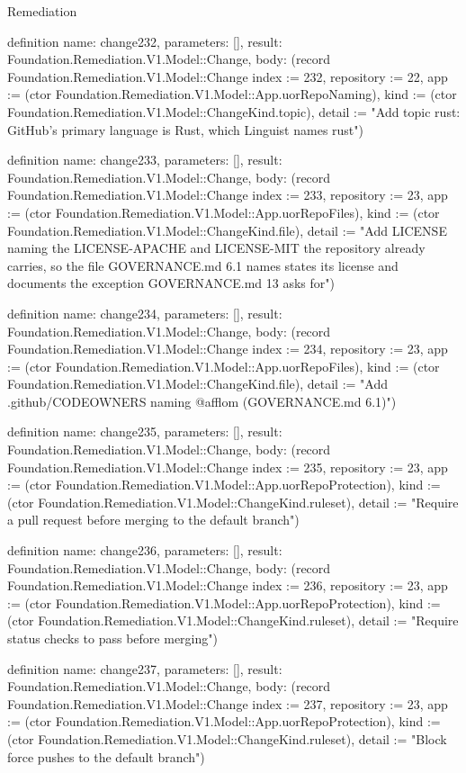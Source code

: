 \begin{lexlean}{Remediation}
\begin{semanticmodule}
definition{
  name: change232,
  parameters: [],
  result: Foundation.Remediation.V1.Model::Change,
  body: (record Foundation.Remediation.V1.Model::Change {index := 232, repository := 22, app := (ctor Foundation.Remediation.V1.Model::App.uorRepoNaming), kind := (ctor Foundation.Remediation.V1.Model::ChangeKind.topic), detail := "Add topic rust: GitHub's primary language is Rust, which Linguist names rust"})
}

definition{
  name: change233,
  parameters: [],
  result: Foundation.Remediation.V1.Model::Change,
  body: (record Foundation.Remediation.V1.Model::Change {index := 233, repository := 23, app := (ctor Foundation.Remediation.V1.Model::App.uorRepoFiles), kind := (ctor Foundation.Remediation.V1.Model::ChangeKind.file), detail := "Add LICENSE naming the LICENSE-APACHE and LICENSE-MIT the repository already carries, so the file GOVERNANCE.md 6.1 names states its license and documents the exception GOVERNANCE.md 13 asks for"})
}

definition{
  name: change234,
  parameters: [],
  result: Foundation.Remediation.V1.Model::Change,
  body: (record Foundation.Remediation.V1.Model::Change {index := 234, repository := 23, app := (ctor Foundation.Remediation.V1.Model::App.uorRepoFiles), kind := (ctor Foundation.Remediation.V1.Model::ChangeKind.file), detail := "Add .github/CODEOWNERS naming @afflom (GOVERNANCE.md 6.1)"})
}

definition{
  name: change235,
  parameters: [],
  result: Foundation.Remediation.V1.Model::Change,
  body: (record Foundation.Remediation.V1.Model::Change {index := 235, repository := 23, app := (ctor Foundation.Remediation.V1.Model::App.uorRepoProtection), kind := (ctor Foundation.Remediation.V1.Model::ChangeKind.ruleset), detail := "Require a pull request before merging to the default branch"})
}

definition{
  name: change236,
  parameters: [],
  result: Foundation.Remediation.V1.Model::Change,
  body: (record Foundation.Remediation.V1.Model::Change {index := 236, repository := 23, app := (ctor Foundation.Remediation.V1.Model::App.uorRepoProtection), kind := (ctor Foundation.Remediation.V1.Model::ChangeKind.ruleset), detail := "Require status checks to pass before merging"})
}

definition{
  name: change237,
  parameters: [],
  result: Foundation.Remediation.V1.Model::Change,
  body: (record Foundation.Remediation.V1.Model::Change {index := 237, repository := 23, app := (ctor Foundation.Remediation.V1.Model::App.uorRepoProtection), kind := (ctor Foundation.Remediation.V1.Model::ChangeKind.ruleset), detail := "Block force pushes to the default branch"})
}


\end{semanticmodule}
\end{lexlean}
